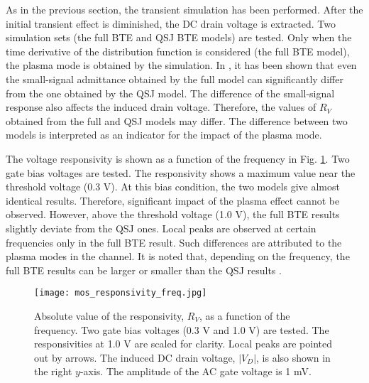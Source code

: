 \documentclass[journal]{IEEEtran}
\newcommand{\revision}[1]{{#1}}
\begin{document}
   As in the previous section, the transient simulation has been performed.
   After the initial transient effect is diminished, the DC drain voltage is extracted.
   Two simulation sets (the full BTE and QSJ BTE models) are tested.
\revision{Only when the time derivative of the distribution function is considered (the full BTE model),
the plasma mode is obtained by the simulation.
   In \cite{Jungemann2017}, it has been shown that even the small-signal admittance obtained by the full model can significantly differ from the one obtained by the QSJ model.
   The difference of the small-signal response also affects the induced drain voltage.
   Therefore, the values of $R_V$ obtained from the full and QSJ models may differ. 
   The difference between two models is interpreted as an indicator for the impact of the plasma mode.}

\revision{The voltage responsivity is shown as a function of the frequency in Fig. \ref{fig_mos_responsivity_vg}.
   Two gate bias voltages are tested.}
   The responsivity shows a maximum value near the threshold voltage \revision{(0.3 V)}.
\revision{At this bias condition, the two models give almost identical results.
   Therefore, significant impact of the plasma effect cannot be observed.}
   However, above the threshold voltage \revision{(1.0 V)}, the full BTE results slightly deviate from the QSJ ones.
\revision{Local peaks are observed at certain frequencies only in the full BTE result.}
   Such differences are attributed to the plasma modes in the channel.  
\revision{It is noted that, depending on the frequency, the full BTE results can be larger or smaller than the QSJ results \cite{Jungemann2017}.}   
        
\begin{figure}[!t]
\centering
\texttt{[image: mos\_responsivity\_freq.jpg]}
\caption{\revision{Absolute value of the responsivity, $R_V$, as a function of the frequency. Two gate bias voltages (0.3 V and 1.0 V) are tested. 
The responsivities at 1.0 V are scaled for clarity.
Local peaks are pointed out by arrows.
The induced DC drain voltage, $|V_D|$, is also shown in the right $y$-axis.
The amplitude of the AC gate voltage is 1 mV.}
}
\label{fig_mos_responsivity_vg}
\end{figure} 

   
\end{document}
